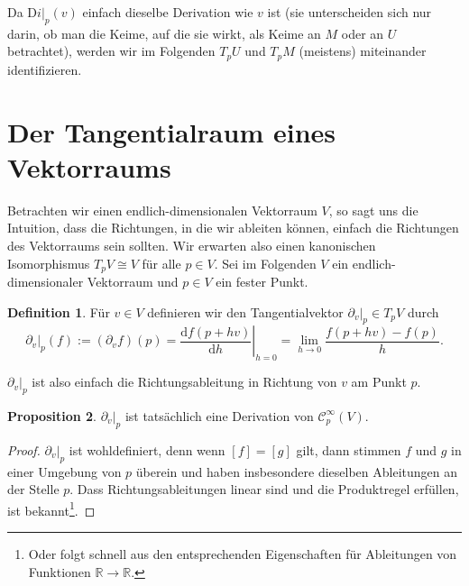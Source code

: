 \documentclass[a4paper]{scrbook}
\numberwithin{equation}{chapter}
\newcommand{\D}{\mathrm{d}}
\newcommand{\DD}{\mathrm{D}}
\newcommand{\sC}{\mathcal{C}^{\infty}}
\theoremstyle{definition}
\newtheorem{defn}{Definition}[section]
\newtheorem{prop}[defn]{Proposition}
\begin{document}
Da $\left.\DD i\right|_p(v)$ einfach dieselbe Derivation wie $v$ ist (sie unterscheiden sich nur darin, ob man die Keime, auf die sie wirkt, als Keime an $M$ oder an $U$ betrachtet), werden wir im Folgenden $T_pU$ und $T_pM$ (meistens) miteinander identifizieren.

\section{Der Tangentialraum eines Vektorraums}

Betrachten wir einen endlich-dimensionalen Vektorraum $V$, so sagt uns die Intuition, dass die Richtungen, in die wir ableiten können, einfach die Richtungen des Vektorraums sein sollten. Wir erwarten also einen kanonischen Isomorphismus $T_pV \cong V$ für alle $p \in V$. Sei im Folgenden $V$ ein endlich-dimensionaler Vektorraum und $p \in V$ ein fester Punkt.
\begin{defn}
	Für $v \in V$ definieren wir den Tangentialvektor $\left.\partial_v\right|_p \in T_pV$ durch
	\[\left.\partial_v\right|_p(f) := (\partial_v f)(p) = \left.\frac{\D f(p + h v)}{\D h}\right|_{h=0} = \lim_{h\to 0} \frac{f(p + h v) - f(p)}{h}.\]
\end{defn}
$\left.\partial_v\right|_p$ ist also einfach die Richtungsableitung in Richtung von $v$ am Punkt $p$.
\begin{prop}
	$\left.\partial_v\right|_p$ ist tatsächlich eine Derivation von $\sC_p(V)$.
	
	\begin{proof}
		$\left.\partial_v\right|_p$ ist wohldefiniert, denn wenn $[f] = [g]$ gilt, dann stimmen $f$ und $g$ in einer Umgebung von $p$ überein und haben insbesondere dieselben Ableitungen an der Stelle $p$. Dass Richtungsableitungen linear sind und die Produktregel erfüllen, ist bekannt\footnote{Oder folgt schnell aus den entsprechenden Eigenschaften für Ableitungen von Funktionen $\mathbb R \to \mathbb R$.}.
	\end{proof}
\end{prop}
\end{document}
